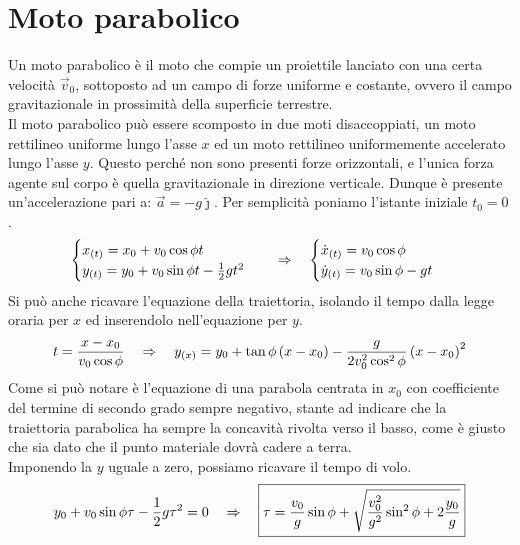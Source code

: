\section{Moto parabolico}
Un moto parabolico è il moto che compie un proiettile lanciato con una
certa velocità $\vec v_0$, sottoposto ad un campo di forze uniforme e
costante, ovvero il campo gravitazionale in prossimità della superficie
terrestre.\\
Il moto parabolico può essere scomposto in due moti disaccoppiati,
un moto rettilineo uniforme lungo l'asse $x$ ed un moto rettilineo
uniformemente accelerato lungo l'asse $y$. Questo perché non sono presenti
forze orizzontali, e l'unica forza agente sul corpo è quella gravitazionale
in direzione verticale. Dunque è presente un'accelerazione pari a:
$\vec a = -g\hat\jmath $. Per semplicità poniamo l'istante iniziale $ t_0 = 0$.
\begin{equation}
    \begin{cases}
        x_{(t)} = x_0 + v_0\cos\phi t\\
        y_{(t)} = y_0 + v_0\sin\phi t - \frac12 g t^2
    \end{cases}\quad\Rightarrow\quad
    \begin{cases}
        \dot x_{(t)} = v_0\cos\phi \\
        \dot y_{(t)} = v_0\sin\phi - gt
    \end{cases}
\label{eq:MP}
\end{equation}
Si può anche ricavare l'equazione della traiettoria, isolando il tempo
dalla legge oraria per $x$ ed inserendolo nell'equazione per $y$.
\begin{equation}
    t = \frac{x-x_0}{v_0\cos\phi}\quad\Rightarrow\quad y_{(x)} =
    y_0 + \tan\phi\left( x-x_0\right)-\frac{g}{2v_0^2\cos^2\phi}\left( x-x_0\right)^2
\label{eq:MP_y(x)}
\end{equation}
Come si può notare è l'equazione di una parabola centrata in $x_0$ con
coefficiente del termine di secondo grado sempre negativo, stante ad
indicare che la traiettoria parabolica ha sempre la concavità rivolta
verso il basso, come è giusto che sia dato che il punto materiale dovrà
cadere a terra.
\\ Imponendo la $y$ uguale a zero, possiamo ricavare il tempo di volo.
\begin{equation}
    y_0 + v_0\sin\phi \tau - \frac12 g \tau^2 = 0 \quad\Rightarrow\quad
    \boxed{\tau = \frac{v_0}{g}\sin\phi + \sqrt{\frac{v_0^2}{g^2}\sin^2\phi+2\frac{y_0}g}}
\label{eq:flytime}
\end{equation}
